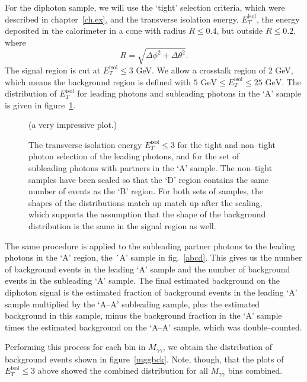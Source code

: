 For the diphoton sample, we will use the `tight' selection criteria, which were described in chapter~\ref{ch.ex}, and the transverse isolation energy, $E_T^{\text{isol}}$, the energy deposited in the calorimeter in a cone with radius $R\le0.4$, but outside $R\le0.2$, where
\[R=\sqrt{\Delta\phi^2+\Delta\theta^2}.\]
The signal region is cut at $E_T^{\text{isol}}\le3$ GeV. We allow a crosstalk region of 2 GeV, which means the background region is defined with $5\text{ GeV}\le E_T^{\text{isol}}\le25\text{ GeV}$. The distribution of $E_T^{\text{isol}}$ for leading photons and subleading photons in the `A' sample is given in figure~\ref{etiso}.

\begin{figure}[htp]
\begin{minipage}[b]{.69\textwidth}
\hspace{-1em}%
\centering (a very impressive plot.)
\end{minipage}\hfill\begin{minipage}[b]{.3\textwidth}
\caption{The transverse isolation energy $E_T^{\text{isol}}\le3$ for the tight and non--tight photon selection of the leading photons, and for the set of subleading photons with partners in the `A' sample. The non--tight samples have been scaled so that the `D' region contains the same number of events as the `B' region. For both sets of samples, the shapes of the distributions match up match up after the scaling, which supports the assumption that the shape of the background distribution is the same in the signal region as well.
\label{etiso}}
\end{minipage}
\end{figure}

The same procedure is applied to the subleading partner photons to the leading photons in the `A' region, the ´A' sample in fig.~\ref{abcd}. This gives us the number of background events in the leading `A' sample and the number of background events in the subleading `A' sample. The final estimated background on the diphoton signal is the estimated fraction of background events in the leading `A' sample multiplied by the `A--A' subleading sample, plus the estimated background in this sample, minus the background fraction in the `A' sample times the estimated background on the `A--A' sample, which was double--counted.

Performing this process for each bin in $M_{\gamma\gamma}$, we obtain the distribution of background events shown in figure~\ref{mggbck}. Note, though, that the plots of $E_T^{\text{isol}}\le3$ above showed the combined distribution for all $M_{\gamma\gamma}$ bins combined.

